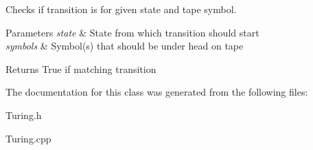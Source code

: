 Checks if transition is for given state and tape symbol. 


\begin{DoxyParams}{Parameters}
{\em state} & State from which transition should start \\
\hline
{\em symbols} & Symbol(s) that should be under head on tape\\
\hline
\end{DoxyParams}
\begin{DoxyReturn}{Returns}
True if matching transition 
\end{DoxyReturn}


The documentation for this class was generated from the following files\-:\begin{DoxyCompactItemize}
\item 
Turing.\-h\item 
Turing.\-cpp\end{DoxyCompactItemize}
